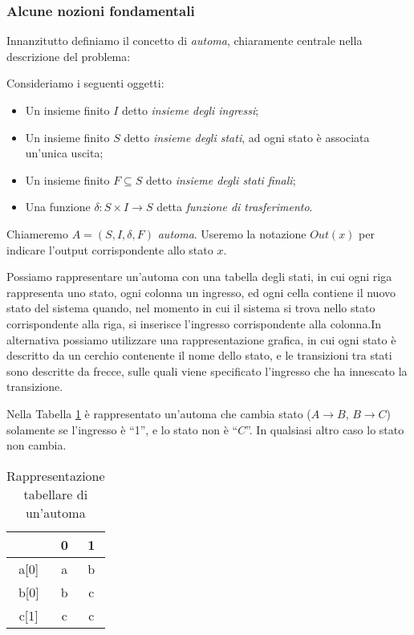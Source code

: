 \subsubsection{Alcune nozioni fondamentali}
Innanzitutto definiamo il concetto di \emph{automa}, chiaramente centrale nella descrizione del problema:
\begin{definition}
    Consideriamo i seguenti oggetti:
    \begin{itemize}
        \item Un insieme finito $I$ detto \emph{insieme degli ingressi};
        \item Un insieme finito $S$ detto \emph{insieme degli stati}, ad ogni stato è associata un'unica uscita;
        \item Un insieme finito $F \subseteq S$ detto \emph{insieme degli stati finali};
        \item Una funzione $\delta: S \times I \to S$ detta \emph{funzione di trasferimento}.
    \end{itemize}
    Chiameremo $A = (S,I,\delta,F)$ \emph{automa}. Useremo la notazione $Out(x)$ per indicare l'output corrispondente allo stato $x$.
\end{definition}
Possiamo rappresentare un'automa con una tabella degli stati, in cui ogni riga rappresenta uno stato, ogni colonna un ingresso, ed ogni cella contiene il nuovo stato del sistema quando, nel momento in cui il sistema si trova nello stato corrispondente alla riga, si inserisce l'ingresso corrispondente alla colonna.In alternativa possiamo utilizzare una rappresentazione grafica, in cui ogni stato è descritto da un cerchio contenente il nome dello stato, e le transizioni tra stati sono descritte da frecce, sulle quali viene specificato l'ingresso che ha innescato la transizione.\\
\begin{example}
    Nella Tabella \ref{fig:tab_automata} è rappresentato un'automa che cambia stato ($A \to B$, $B \to C$) solamente se l'ingresso è ``1'', e lo stato non è ``$C$''. In qualsiasi altro caso lo stato non cambia.
    \begin{table}[ht]
        \centering
        \begin{tabular}{ c | c c }
            \hline
            & 0 & 1\\
            \hline
            a[0] & a & b \\
            b[0] & b & c \\
            c[1] & c & c \\
            \hline
          \end{tabular}
        \caption{Rappresentazione tabellare di un'automa}
        \label{fig:tab_automata}
    \end{table}
    \label{exa:automata_tab}
\end{example}
